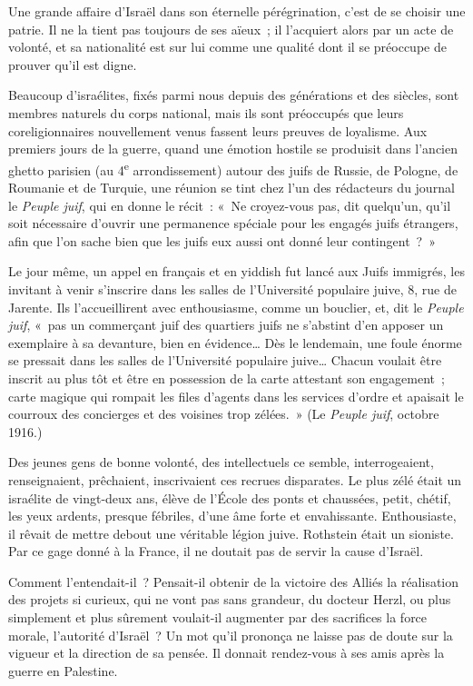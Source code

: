 \documentclass[french,twoside]{book} %
\newcommand\chaptercont{} %
\begin{document}
\chaptercont
\noindent Une grande affaire d’Israël dans son éternelle pérégrination, c’est de se choisir une patrie. Il ne la tient pas toujours de ses aïeux ; il l’acquiert alors par un acte de volonté, et sa nationalité est sur lui comme une qualité dont il se préoccupe de prouver qu’il est digne.‌\par
Beaucoup d’israélites, fixés parmi nous depuis des générations et des siècles, sont membres naturels du corps national, mais ils sont préoccupés que leurs coreligionnaires nouvellement venus fassent leurs preuves de loyalisme. Aux premiers jours de la guerre, quand une émotion hostile se produisit dans l’ancien ghetto parisien (au 4\textsuperscript{e} arrondissement) autour des juifs de Russie, de Pologne, de Roumanie et de Turquie, une réunion se tint chez l’un des rédacteurs du journal le {\itshape Peuple juif}, qui en donne le récit : « Ne croyez-vous pas, dit quelqu’un, qu’il soit nécessaire d’ouvrir une permanence spéciale pour les engagés juifs étrangers, afin que l’on sache bien que les juifs eux aussi ont donné leur contingent ? »‌\par
Le jour même, un appel en français et en yiddish fut lancé aux Juifs immigrés, les invitant à venir s’inscrire dans les salles de l’Université populaire juive, 8, rue de Jarente. Ils l’accueillirent avec enthousiasme, comme un bouclier, et, dit le {\itshape Peuple juif}, « pas un commerçant juif des quartiers juifs ne s’abstint d’en apposer un exemplaire à sa devanture, bien en évidence… Dès le lendemain, une foule énorme se pressait dans les salles de l’Université populaire juive… Chacun voulait être inscrit au plus tôt et être en possession de la carte attestant son engagement ; carte magique qui rompait les files d’agents dans les services d’ordre et apaisait le courroux des concierges et des voisines trop zélées. » (Le {\itshape Peuple juif}, octobre 1916.)‌\par
Des jeunes gens de bonne volonté, des intellectuels ce semble, interrogeaient, renseignaient, prêchaient, inscrivaient ces recrues disparates. Le plus zélé était un israélite de vingt-deux ans, élève de l’École des ponts et chaussées, petit, chétif, les yeux ardents, presque fébriles, d’une âme forte et envahissante. Enthousiaste, il rêvait de mettre debout une véritable légion juive. Rothstein était un sioniste. Par ce gage donné à la France, il ne doutait pas de servir la cause d’Israël.‌\par
Comment l’entendait-il ? Pensait-il obtenir de la victoire des Alliés la réalisation des projets si curieux, qui ne vont pas sans grandeur, du docteur Herzl, ou plus simplement et plus sûrement voulait-il augmenter par des sacrifices la force morale, l’autorité d’Israël ? Un mot qu’il prononça ne laisse pas de doute sur la vigueur et la direction de sa pensée. Il donnait rendez-vous à ses amis après la guerre en Palestine.‌\par
\end{document}
